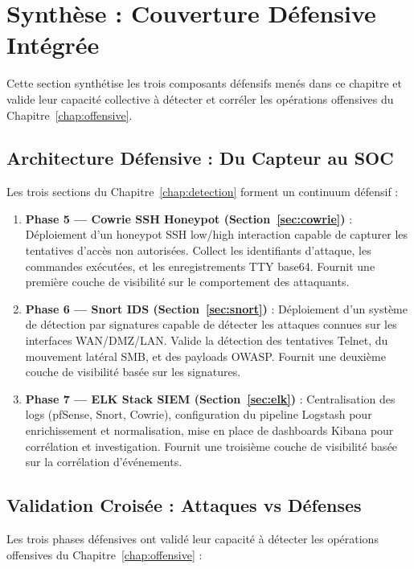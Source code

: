 \documentclass[12pt,a4paper,openany]{report}
\begin{document}
	
	\section{Synthèse : Couverture Défensive Intégrée}
	
	Cette section synthétise les trois composants défensifs menés dans ce chapitre et valide leur capacité collective à détecter et corréler les opérations offensives du Chapitre~\ref{chap:offensive}.
	
	\subsection{Architecture Défensive : Du Capteur au SOC}
	
	Les trois sections du Chapitre~\ref{chap:detection} forment un continuum défensif :
	
	\begin{enumerate}
		\item \textbf{Phase 5 — Cowrie SSH Honeypot (Section~\ref{sec:cowrie})} : Déploiement d'un honeypot SSH low/high interaction capable de capturer les tentatives d'accès non autorisées. Collect les identifiants d'attaque, les commandes exécutées, et les enregistrements TTY base64. Fournit une première couche de visibilité sur le comportement des attaquants.
		
		\item \textbf{Phase 6 — Snort IDS (Section~\ref{sec:snort})} : Déploiement d'un système de détection par signatures capable de détecter les attaques connues sur les interfaces WAN/DMZ/LAN. Valide la détection des tentatives Telnet, du mouvement latéral SMB, et des payloads OWASP. Fournit une deuxième couche de visibilité basée sur les signatures.
		
		\item \textbf{Phase 7 — ELK Stack SIEM (Section~\ref{sec:elk})} : Centralisation des logs (pfSense, Snort, Cowrie), configuration du pipeline Logstash pour enrichissement et normalisation, mise en place de dashboards Kibana pour corrélation et investigation. Fournit une troisième couche de visibilité basée sur la corrélation d'événements.
	\end{enumerate}
	
	\subsection{Validation Croisée : Attaques vs Défenses}
	
	Les trois phases défensives ont validé leur capacité à détecter les opérations offensives du Chapitre~\ref{chap:offensive} :
	
\end{document}
